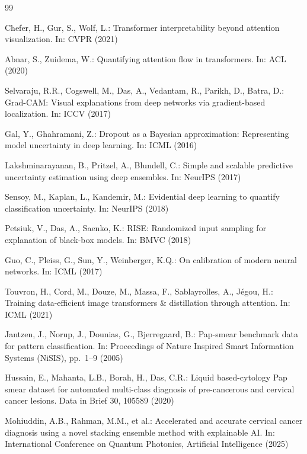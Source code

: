 \documentclass[runningheads]{llncs}
\begin{document}
\begin{thebibliography}{99}

Chefer, H., Gur, S., Wolf, L.: Transformer interpretability beyond
attention visualization. In: CVPR (2021)

Abnar, S., Zuidema, W.: Quantifying attention flow in transformers. In:
ACL (2020)

Selvaraju, R.R., Cogswell, M., Das, A., Vedantam, R., Parikh, D., Batra,
D.: Grad-CAM: Visual explanations from deep networks via gradient-based
localization. In: ICCV (2017)

Gal, Y., Ghahramani, Z.: Dropout as a Bayesian approximation:
Representing model uncertainty in deep learning. In: ICML (2016)

Lakshminarayanan, B., Pritzel, A., Blundell, C.: Simple and scalable
predictive uncertainty estimation using deep ensembles. In: NeurIPS (2017)

Sensoy, M., Kaplan, L., Kandemir, M.: Evidential deep learning to
quantify classification uncertainty. In: NeurIPS (2018)

Petsiuk, V., Das, A., Saenko, K.: RISE: Randomized input sampling for
explanation of black-box models. In: BMVC (2018)

Guo, C., Pleiss, G., Sun, Y., Weinberger, K.Q.: On calibration of modern
neural networks. In: ICML (2017)

Touvron, H., Cord, M., Douze, M., Massa, F., Sablayrolles, A., J\'egou,
H.: Training data-efficient image transformers \& distillation through
attention. In: ICML (2021)

Jantzen, J., Norup, J., Dounias, G., Bjerregaard, B.: Pap-smear benchmark
data for pattern classification. In: Proceedings of Nature Inspired Smart
Information Systems (NiSIS), pp.\ 1--9 (2005)

Hussain, E., Mahanta, L.B., Borah, H., Das, C.R.: Liquid based-cytology
Pap smear dataset for automated multi-class diagnosis of pre-cancerous
and cervical cancer lesions. Data in Brief 30, 105589 (2020)

Mohiuddin, A.B., Rahman, M.M., et al.: Accelerated and accurate cervical
cancer diagnosis using a novel stacking ensemble method with explainable
AI. In: International Conference on Quantum Photonics, Artificial
Intelligence (2025)


\end{thebibliography}
\end{document}
